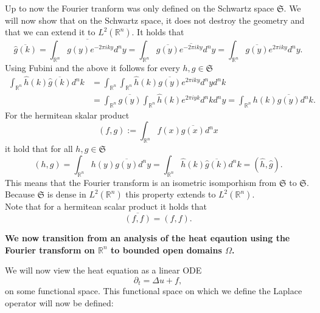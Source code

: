 \documentclass[A4,12pt,twoside]{book}
\begin{document}
Up to now the Fourier tranform was only defined on the Schwartz space $\mathfrak{S}$. We will now show that on the Schwartz space, it does not destroy the geometry and that we can extend it to $L^2(\mathbb{R}^n)$.
It holds that 
\[
\overline{\hat{g}(k)} = \overline{\int_{\mathbb{R}^n} g(y) e^{-2 \pi i k y} d^n y} = \int_{\mathbb{R}^n} \overline{g(y)} \overline{e^{-2 \pi i k y}} d^n y = \int_{\mathbb{R}^n} \overline{g(y)} e^{2 \pi i k y} d^n y.
\]
Using Fubini and the above it follows for every $h,g \in \mathfrak{S}$  
\begin{align*}
    \int_{\mathbb{R}^n} \hat{h}(k) \overline{\hat{g}(k)} d^n k &= \int_{\mathbb{R}^n} \int_{\mathbb{R}^n} \hat{h}(k) \overline{g(y)} e^{2 \pi i ky } d^n y d^n k \\
    &= \int_{\mathbb{R}^n} \overline{g(y)}  \int_{\mathbb{R}^n} \hat{h}(k)  e^{2 \pi i yk } d^n k d^n y  = \int_{\mathbb{R}^n} h (k) \overline{g(y)} d^n k.
\end{align*}
For the hermitean skalar product 
\[
( f,g ) := \int_{\mathbb{R}^n} f(x) \overline{g(x)} d^n x
\]
it hold that for all $h,g \in \mathfrak{S}$
\[
(h,g) = \int_{\mathbb{R}^n} h(y) \overline{g(y)} d^n y = \int_{\mathbb{R}^n} \hat{h}(k) \overline{\hat{g}(k)} d^n k = (\hat{h}, \hat{g}).
\]
This means that the Fourier transform is an isometric isomporhism from $\mathfrak{S}$ to $\mathfrak{S}$. Because $\mathfrak{S}$ is dense in $L^2(\mathbb{R}^n)$ this property extends to $L^2 (\mathbb{R}^n)$.\\
Note that for a hermitean scalar product it holds that 
\[
\overline{(f,f)} =(f,f).
\]

\textbf{We now transition from an analysis of the heat eqaution using the Fourier transform on $\mathbb{R}^n$ to bounded open domains $\Omega$.}

We will now view the heat equation as a linear ODE 
\[
\partial_t = \Delta u + f,
\]
on some functional space. This functional space on which we define the Laplace operator will now be defined:
\end{document}
